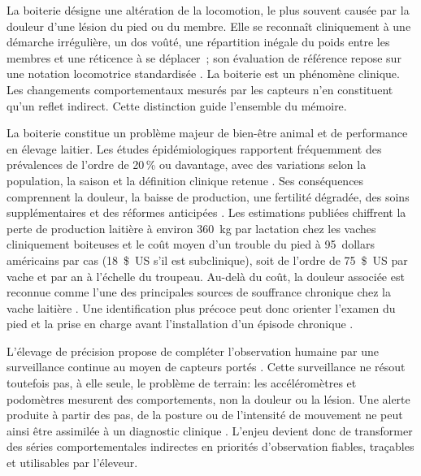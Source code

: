 \begin{introduction}

La boiterie désigne une altération de la locomotion, le plus souvent causée par la douleur
d'une lésion du pied ou du membre. Elle se reconnaît cliniquement à une démarche irrégulière,
un dos voûté, une répartition inégale du poids entre les membres et une réticence à se
déplacer~; son évaluation de référence repose sur une notation locomotrice standardisée
\citep{sprecher1997lameness,chapinal2010measurement}. La boiterie est un phénomène clinique.
Les changements comportementaux mesurés par les capteurs n'en constituent qu'un reflet
indirect. Cette distinction guide l'ensemble du mémoire.

La boiterie constitue un problème majeur de bien-être animal et de performance en élevage
laitier.
Les études épidémiologiques rapportent fréquemment des prévalences de l'ordre de 20\,\% ou
davantage, avec des variations selon la population, la saison et la définition clinique
retenue \citep{whay2003assessment,cook2003prevalence}. Ses
conséquences comprennent la douleur, la baisse de production, une fertilité dégradée, des
soins supplémentaires et des réformes anticipées
\citep{green2002financial,bruijnis2010assessing}. Les estimations publiées chiffrent la
perte de production laitière à environ 360~kg par lactation chez les vaches cliniquement
boiteuses et le coût moyen d'un trouble du pied à 95~dollars américains par cas (18~\$~US
s'il est subclinique), soit de l'ordre de 75~\$~US par vache et par an à l'échelle
du troupeau. Au-delà du coût, la douleur associée est
reconnue comme l'une des principales sources de souffrance chronique chez la vache laitière
\citep{whay2003assessment}. Une identification plus précoce peut donc orienter l'examen du
pied et la prise en charge avant l'installation d'un épisode chronique
\citep{ahdb_mobility_score_sheet_48h_score2}.

L'élevage de précision propose de compléter l'observation humaine par une surveillance
continue au moyen de capteurs portés \citep{bewley2015precision}. Cette surveillance ne
résout toutefois pas, à elle seule, le problème de terrain: les accéléromètres et podomètres
mesurent des comportements, non la douleur ou la lésion. Une alerte produite à partir des pas,
de la posture ou de l'intensité de mouvement ne peut ainsi être assimilée à un diagnostic
clinique \citep{alsaaod2019automatic,oleary2020accelerometers}. L'enjeu devient donc de
transformer des séries comportementales indirectes en priorités d'observation fiables,
traçables et utilisables par l'éleveur.


\end{introduction}
